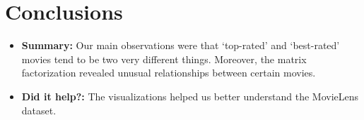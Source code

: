 \section{Conclusions}
\medskip
\begin{itemize}
  \item \textbf{Summary:} Our main observations were that `top-rated' and `best-rated' movies tend to be two very different things. Moreover, the matrix factorization revealed unusual relationships between certain movies. 
  \item \textbf{Did it help?:} The visualizations helped us better understand the MovieLens dataset. 
\end{itemize}


